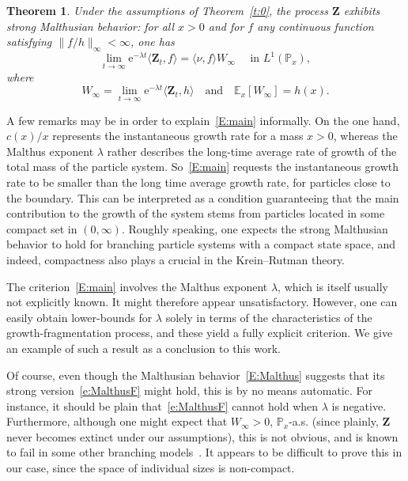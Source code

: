 \documentclass[11pt]{article}
\newtheorem{theo}{Theorem}[section]
\theoremstyle{definition}
\numberwithin{equation}{section}
\numberwithin{figure}{section}
\numberwithin{table}{section}
\newcommand\Zz{\mathbf{Z}}
\newcommand\PP{\mathbb{P}}
\newcommand\EE{\mathbb{E}}
\newcommand\e{\mathrm{e}}
\newcommand{\crochet}[1]{{\langle #1 \rangle}}
\begin{document}
\begin{theo}\label{t:main}
Under the assumptions of Theorem~\ref{t:0}, the process $\Zz$ exhibits \emph{strong Malthusian behavior}: for all $x>0$ and for $f$ any continuous function satisfying $\lVert f/h \rVert_{\infty}<\infty$, one has
\goodbreak
\begin{equation}\label{e:MalthusF}
\lim_{t\to \infty} \e^{-\lambda t} \crochet{ \Zz_t,f}= \crochet{\nu,f} W_{\infty} \quad \text{ in }L^1(\PP_x),
\end{equation}
where
\[
W_\infty=\lim_{t\to \infty} \e^{-\lambda t} \crochet{ \Zz_t,h} \quad\text{and} \quad \EE_x[W_{\infty}]=h(x).
\]
\end{theo}

A few remarks may be in order to explain~\eqref{E:main} informally. On the one hand, $c(x)/x$ represents the instantaneous growth rate for a mass $x>0$, whereas the Malthus exponent $\lambda$ rather describes the long-time average rate of growth of the total mass of the particle system. So~\eqref{E:main} requests the instantaneous growth rate to be smaller than the long time average growth rate, for particles close to the boundary. This can be interpreted as a condition guaranteeing that the main contribution to the growth of the system stems from particles located in some compact set in $(0,\infty)$. Roughly speaking, one expects the strong Malthusian behavior to hold for branching particle systems with a compact state space, and indeed, compactness also plays a crucial in the Krein--Rutman theory.

The criterion~\eqref{E:main} involves the Malthus exponent $\lambda$, which is itself usually not explicitly known. It might therefore appear unsatisfactory. However, one can easily obtain lower-bounds for $\lambda$ solely in terms of the characteristics of the growth-fragmentation process, and these yield a fully explicit criterion. We give an example of such a result as a conclusion to this work.

Of course, even though the Malthusian behavior~\eqref{E:Malthus} suggests that its strong version~\eqref{e:MalthusF} might hold, this is by no means automatic. For instance, it should be plain that~\eqref{e:MalthusF} cannot hold when $\lambda$ is negative. Furthermore, although one might expect that $W_\infty > 0$, $\PP_x$-a.s. (since plainly, $\Zz$ never becomes extinct under our assumptions), this is not obvious, and is known to fail in some other branching models~\cite{DB-bpre}. It appears to be difficult to prove this in our case, since the space of individual sizes is non-compact.
\end{document}
